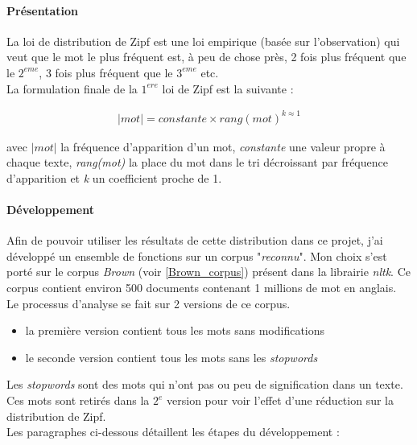 	\paragraph{Présentation}
		La loi de distribution de Zipf est une loi empirique (basée sur l'observation) qui veut que le mot le plus fréquent est, à peu de chose près, 2 fois plus fréquent que le $2^{eme}$, 3 fois plus fréquent que le $3^{eme}$ etc.\\

		La formulation finale de la $1^{ere}$ loi de Zipf est la suivante :

		\begin{align*}
				|mot| = constante \times rang(mot)^{k \approx 1}
		\end{align*}

		avec \emph{$|mot|$} la fréquence d'apparition d'un mot, \emph{constante} une valeur propre à chaque texte, \emph{rang(mot)} la place du mot dans le tri décroissant par fréquence d'apparition et \emph{k} un coefficient proche de 1. 

	\paragraph{Développement}
		Afin de pouvoir utiliser les résultats de cette distribution dans ce projet, j'ai développé un ensemble de fonctions sur un corpus "\emph{reconnu}". Mon choix s'est porté sur le corpus \emph{Brown} (voir \ref{Brown_corpus}) présent dans la librairie \emph{nltk}. Ce corpus contient environ 500 documents contenant 1 millions de mot en anglais.\\

		Le processus d'analyse se fait sur 2 versions de ce corpus.
		\begin{itemize}
			\item la première version contient tous les mots sans modifications
			\item le seconde version contient tous les mots sans les \emph{stopwords}
		\end{itemize}
		Les \emph{stopwords} sont des mots qui n'ont pas ou peu de signification dans un texte. Ces mots sont retirés dans la $2^e$ version pour voir l'effet d'une réduction sur la distribution de Zipf. \\

		Les paragraphes ci-dessous détaillent les étapes du développement :

